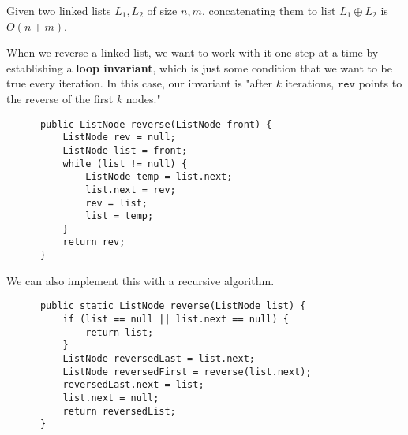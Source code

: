   \begin{algo}
    
  \end{algo}

  \begin{algo}
    
  \end{algo}

  \begin{algo}
    
  \end{algo}

  \begin{algo}
    
  \end{algo}

  \begin{algo}
    
  \end{algo} 

  \begin{algo}
    Given two linked lists $L_1, L_2$ of size $n, m$,  concatenating them to list $L_1 \oplus L_2$ is $O(n + m)$. 
  \end{algo}

  \begin{algo}
    When we reverse a linked list, we want to work with it one step at a time by establishing a \textbf{loop invariant}, which is just some condition that we want to be true every iteration. In this case, our invariant is "after $k$ iterations, $\texttt{rev}$ points to the reverse of the first $k$ nodes." 
    \begin{lstlisting}
      public ListNode reverse(ListNode front) {
          ListNode rev = null; 
          ListNode list = front; 
          while (list != null) {
              ListNode temp = list.next; 
              list.next = rev; 
              rev = list; 
              list = temp; 
          }
          return rev; 
      }
    \end{lstlisting}
    We can also implement this with a recursive algorithm. 
    \begin{lstlisting}
      public static ListNode reverse(ListNode list) {
          if (list == null || list.next == null) {
              return list; 
          }
          ListNode reversedLast = list.next; 
          ListNode reversedFirst = reverse(list.next); 
          reversedLast.next = list; 
          list.next = null; 
          return reversedList; 
      }
    \end{lstlisting}
  \end{algo}

